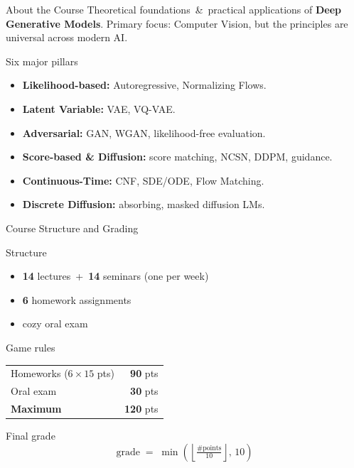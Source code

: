 \documentclass{beamer}
\begin{document}
\begin{frame}{About the Course}
    Theoretical foundations \,\&\, practical applications of \textbf{Deep Generative Models}. Primary focus: Computer Vision, but the principles are universal across modern AI.
    \eqpause
    \begin{block}{Six major pillars}
        \begin{itemize}
            \setlength{\itemsep}{0.1em}
            \item \textbf{Likelihood-based:} Autoregressive, Normalizing Flows.
            \item \textbf{Latent Variable:} VAE, VQ-VAE.
            \item \textbf{Adversarial:} GAN, WGAN, likelihood-free evaluation.
            \item \textbf{Score-based \& Diffusion:} score matching, NCSN, DDPM, guidance.
            \item \textbf{Continuous-Time:} CNF, SDE/ODE, Flow Matching.
            \item \textbf{Discrete Diffusion:} absorbing, masked diffusion LMs.
        \end{itemize}
    \end{block}
\end{frame}
\begin{frame}{Course Structure and Grading}
    \begin{block}{Structure}
        \begin{itemize}
            \item \textbf{14} lectures \,+\, \textbf{14} seminars (one per week)
            \item \textbf{6} homework assignments
            \item cozy oral exam
        \end{itemize}
    \end{block}
    \eqpause
    \begin{block}{Game rules}
        \centering
        \begin{tabular}{lr}
            Homeworks \;($6 \times 15$ pts) & \textbf{90} pts  \\
            Oral exam                       & \textbf{30} pts  \\
            \midrule
            \textbf{Maximum}                & \textbf{120} pts \\
        \end{tabular}
    \end{block}
    \eqpause
    \vspace{-0.1cm}
    \begin{block}{Final grade}
        \vspace{-0.4cm}
        $$
            \boxed{\;\text{grade} \;=\; \min\!\left(\left\lfloor \tfrac{\#\text{points}}{10} \right\rfloor,\, 10\right)\;}
        $$
    \end{block}
\end{frame}
\end{document}

